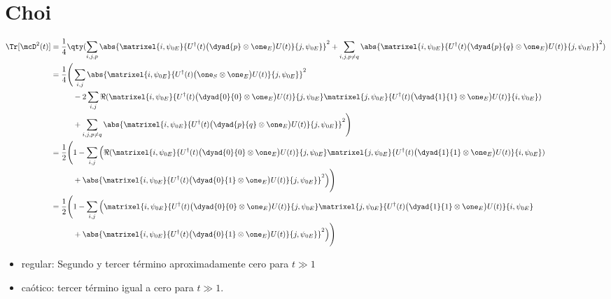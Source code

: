 \section{Choi} \label{app:choi}
\begin{align}
\label{eq:appendix:A:1}
\Tr[\mcD^2(t)] &= 
\frac{1}{4}
\qty(
\sum_{i,j,p}
\abs{\matrixel{i, \psi_{0E}}
{U^\dagger(t) \big(\dyad{p} \otimes \one_E\big) U(t)}
{j, \psi_{0E}}
}^2 +
\sum_{i,j,p\ne q}
\abs{\matrixel{i, \psi_{0E}}
{U^\dagger(t) \big(\dyad{p}{q} \otimes \one_E\big) U(t)}
{j, \psi_{0E}}
}^2
) \\
\label{eq:appendix:A:2}
&= 
\frac{1}{4}
\Bigg(
\sum_{i,j}
\abs{\matrixel{i, \psi_{0E}}
{U^\dagger(t) \big(\one_S \otimes \one_E\big) U(t)}
{j, \psi_{0E}}
}^2 
\nonumber \\
&\hspace*{10mm}
- 2 \sum_{i,j}
\Re(
\matrixel{i, \psi_{0E}}
{U^\dagger(t) \big(\dyad{0}{0} \otimes \one_E\big) U(t)}
{j, \psi_{0E}}
\matrixel{j, \psi_{0E}}
{U^\dagger(t) \big(\dyad{1}{1} \otimes \one_E\big) U(t)}
{i, \psi_{0E}}
)
\nonumber \\
& \hspace*{10mm}
+ \sum_{i,j,p\ne q}
\abs{\matrixel{i, \psi_{0E}}
{U^\dagger(t) \big(\dyad{p}{q} \otimes \one_E\big) U(t)}
{j, \psi_{0E}}
}^2
\Bigg) \\
\label{eq:appendix:A:3}
&= 
\frac{1}{2} 
\Bigg(
1 - 
\sum_{i,j}
\Big( \Re(
\matrixel{i, \psi_{0E}}
{U^\dagger(t) \big(\dyad{0}{0} \otimes \one_E\big) U(t)}
{j, \psi_{0E}}
\matrixel{j, \psi_{0E}}
{U^\dagger(t) \big(\dyad{1}{1} \otimes \one_E\big) U(t)}
{i, \psi_{0E}}
)
\nonumber \\
& \hspace*{10mm}
+
\abs{\matrixel{i, \psi_{0E}}
{U^\dagger(t) \big(\dyad{0}{1} \otimes \one_E\big) U(t)}
{j, \psi_{0E}}
}^2
\Big)
\Bigg) \\
\label{eq:appendix:A:4}
&= 
\frac{1}{2} 
\Bigg(
1 - 
\sum_{i,j}
\Big(
\matrixel{i, \psi_{0E}}
{U^\dagger(t) \big(\dyad{0}{0} \otimes \one_E\big) U(t)}
{j, \psi_{0E}}
\matrixel{j, \psi_{0E}}
{U^\dagger(t) \big(\dyad{1}{1} \otimes \one_E\big) U(t)}
{i, \psi_{0E}}
\nonumber \\
& \hspace*{10mm}
+
\abs{\matrixel{i, \psi_{0E}}
{U^\dagger(t) \big(\dyad{0}{1} \otimes \one_E\big) U(t)}
{j, \psi_{0E}}
}^2
\Big)
\Bigg)
\end{align}
\begin{itemize}
\item regular: Segundo y tercer término aproximadamente cero para $t\gg 1$
\item caótico: tercer término igual a cero para $t\gg 1$.
\end{itemize}


